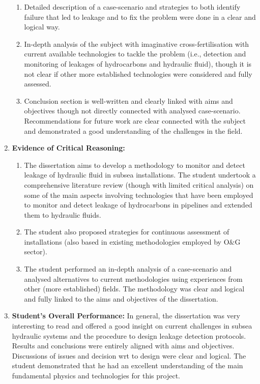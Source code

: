 \documentclass[14pt,twoside]{report}
\begin{document}
\begin{enumerate}
\begin{enumerate}
                   \item Detailed description of a case-scenario and strategies to both identify failure that led to leakage and to fix the problem were done in a clear and logical way.
                   \item In-depth analysis of the subject with imaginative cross-fertilisation with current available technologies to tackle the problem (i.e., detection and monitoring of leakages of hydrocarbons and hydraulic fluid), though it is not clear if other more established technologies were considered and fully assessed.
                   \item Conclusion section is well-written and clearly linked with aims and objectives though not directly connected with analysed case-scenario. Recommendations for future work are clear connected with the subject and demonstrated a good understanding of the challenges in the field. 
                \end{enumerate}
%
    \item {\bf Evidence of Critical Reasoning:}  
                \begin{enumerate}
                   \item The dissertation aims to develop a methodology to monitor and detect leakage of hydraulic fluid in subsea installations. The student undertook a comprehensive literature review (though with limited critical analysis) on some of the main aspects involving technologies that have been employed to monitor and detect leakage of hydrocarbons in pipelines and extended them to hydraulic fluids. 
                   \item The student also proposed strategies for continuous assessment of installations (also based in existing methodologies employed by O$\&$G sector).  
                   \item The student performed an in-depth analysis of a case-scenario and analysed alternatives to current methodologies using experiences from other (more established) fields. The methodology was clear and logical and fully linked to the aims and objectives of the dissertation. 
                \end{enumerate}
%
    \item {\bf Student's Overall Performance:} In general, the dissertation was very interesting to read and offered a good insight on current challenges in subsea hydraulic systems and the procedure to design leakage detection protocols. Results and conclusions were entirely aligned with aims and objectives. Discussions of issues and decision wrt to design were clear and logical. The student demonstrated that he had an excellent understanding of the main fundamental physics and technologies for this project.
%
\end{enumerate}
\clearpage
\end{document}
